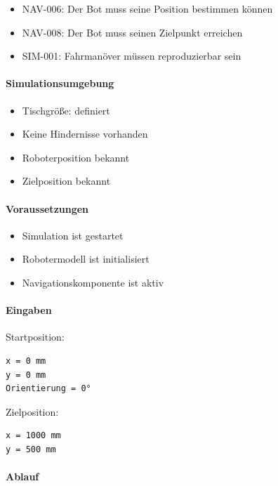 \documentclass[
  a4paper,
  12pt,
  DIV=12,        %
  parskip=half,  %
  headings=small %
]{scrartcl}
\theoremstyle{definition}
\providecommand{\tightlist}{%
  \setlength{\itemsep}{0pt}\setlength{\parskip}{0pt}}
\theoremstyle{definition}
\begin{document}
\begin{itemize}
\tightlist
\item
  NAV-006: Der Bot muss seine Position bestimmen können
\item
  NAV-008: Der Bot muss seinen Zielpunkt erreichen
\item
  SIM-001: Fahrmanöver müssen reproduzierbar sein
\end{itemize}

\paragraph{Simulationsumgebung}\label{simulationsumgebung-1}

\begin{itemize}
\tightlist
\item
  Tischgröße: definiert
\item
  Keine Hindernisse vorhanden
\item
  Roboterposition bekannt
\item
  Zielposition bekannt
\end{itemize}

\paragraph{Voraussetzungen}\label{voraussetzungen-16}

\begin{itemize}
\tightlist
\item
  Simulation ist gestartet
\item
  Robotermodell ist initialisiert
\item
  Navigationskomponente ist aktiv
\end{itemize}

\paragraph{Eingaben}\label{eingaben-15}

Startposition:

\begin{verbatim}
x = 0 mm
y = 0 mm
Orientierung = 0°
\end{verbatim}

Zielposition:

\begin{verbatim}
x = 1000 mm
y = 500 mm
\end{verbatim}

\paragraph{Ablauf}\label{ablauf-16}
\end{document}
